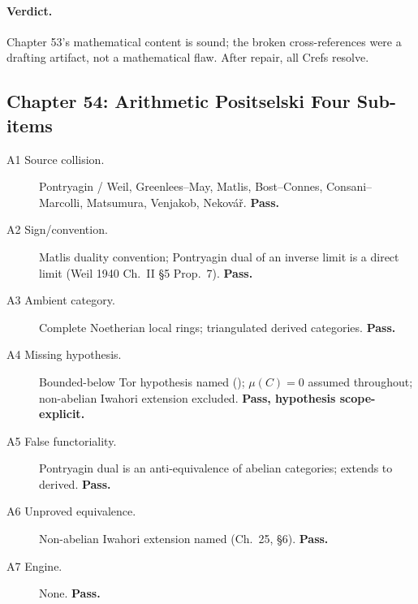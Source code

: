 \paragraph{Verdict.} Chapter 53's mathematical content is sound;
the broken cross-references were a drafting artifact, not a
mathematical flaw. After repair, all Crefs resolve.

\subsection{Chapter 54: Arithmetic Positselski Four Sub-items}
\label{v4-arith:w6-j:ch54}

\begin{description}
\item[A1 Source collision.] Pontryagin / Weil, Greenlees--May,
Matlis, Bost--Connes, Consani--Marcolli, Matsumura, Venjakob,
Nekov\'a\v{r}. \textbf{Pass.}
\item[A2 Sign/convention.] Matlis duality convention; Pontryagin
dual of an inverse limit is a direct limit (Weil 1940
Ch.~II \S5 Prop.~7). \textbf{Pass.}
\item[A3 Ambient category.] Complete Noetherian local rings;
triangulated derived categories. \textbf{Pass.}
\item[A4 Missing hypothesis.] Bounded-below Tor hypothesis named
(); \(\mu(C)=0\) assumed
throughout; non-abelian Iwahori extension excluded.
\textbf{Pass, hypothesis scope-explicit.}
\item[A5 False functoriality.] Pontryagin dual is an
anti-equivalence of abelian categories; extends to derived.
\textbf{Pass.}
\item[A6 Unproved equivalence.] Non-abelian Iwahori extension named
(Ch.~25, \S 6). \textbf{Pass.}
\item[A7 Engine.] None. \textbf{Pass.}
\end{description}

